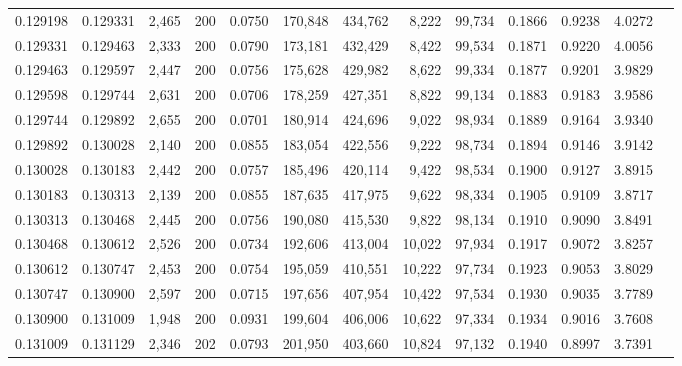 \begin{tabular}{rrrrrrrrrrrrr}
0.129198 & 0.129331 &  2,465 & 200 &                                     0.0750 & 170,848 & 434,762 &   8,222 &  99,734 & 0.1866 & 0.9238 & 4.0272 \\
0.129331 & 0.129463 &  2,333 & 200 &                                     0.0790 & 173,181 & 432,429 &   8,422 &  99,534 & 0.1871 & 0.9220 & 4.0056 \\
0.129463 & 0.129597 &  2,447 & 200 &                                     0.0756 & 175,628 & 429,982 &   8,622 &  99,334 & 0.1877 & 0.9201 & 3.9829 \\
0.129598 & 0.129744 &  2,631 & 200 &                                     0.0706 & 178,259 & 427,351 &   8,822 &  99,134 & 0.1883 & 0.9183 & 3.9586 \\
0.129744 & 0.129892 &  2,655 & 200 &                                     0.0701 & 180,914 & 424,696 &   9,022 &  98,934 & 0.1889 & 0.9164 & 3.9340 \\
0.129892 & 0.130028 &  2,140 & 200 &                                     0.0855 & 183,054 & 422,556 &   9,222 &  98,734 & 0.1894 & 0.9146 & 3.9142 \\
0.130028 & 0.130183 &  2,442 & 200 &                                     0.0757 & 185,496 & 420,114 &   9,422 &  98,534 & 0.1900 & 0.9127 & 3.8915 \\
0.130183 & 0.130313 &  2,139 & 200 &                                     0.0855 & 187,635 & 417,975 &   9,622 &  98,334 & 0.1905 & 0.9109 & 3.8717 \\
0.130313 & 0.130468 &  2,445 & 200 &                                     0.0756 & 190,080 & 415,530 &   9,822 &  98,134 & 0.1910 & 0.9090 & 3.8491 \\
0.130468 & 0.130612 &  2,526 & 200 &                                     0.0734 & 192,606 & 413,004 &  10,022 &  97,934 & 0.1917 & 0.9072 & 3.8257 \\
0.130612 & 0.130747 &  2,453 & 200 &                                     0.0754 & 195,059 & 410,551 &  10,222 &  97,734 & 0.1923 & 0.9053 & 3.8029 \\
0.130747 & 0.130900 &  2,597 & 200 &                                     0.0715 & 197,656 & 407,954 &  10,422 &  97,534 & 0.1930 & 0.9035 & 3.7789 \\
0.130900 & 0.131009 &  1,948 & 200 &                                     0.0931 & 199,604 & 406,006 &  10,622 &  97,334 & 0.1934 & 0.9016 & 3.7608 \\
0.131009 & 0.131129 &  2,346 & 202 &                                     0.0793 & 201,950 & 403,660 &  10,824 &  97,132 & 0.1940 & 0.8997 & 3.7391 \\

\end{tabular}
